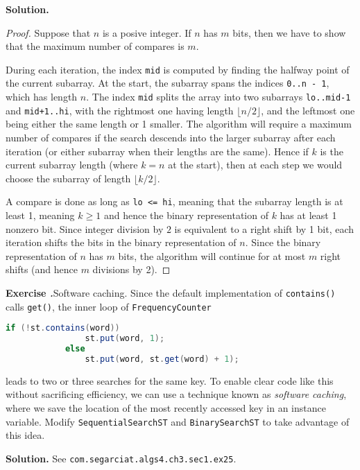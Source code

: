 \documentclass[12pt, a4paper]{article}
\newenvironment{ex}[2][Exercise]
{\par\medskip\noindent \textbf{#1 #2.}}
{\medskip}
\newenvironment{sol}[1][Solution]
{\par\medskip\noindent \textbf{#1.} }
{\medskip}
\begin{document}
	\begin{sol}
		\begin{proof}
			Suppose that $n$ is a posive integer. If $n$ has $m$ bits, then we have to
			show that the maximum number of compares is $m$.
			
			During each iteration, the index \texttt{mid} is computed by finding the
			halfway point of the current subarray. At the start, the subarray spans
			the indices \texttt{0..n - 1}, which has length $n$. The index \texttt{mid}
			splits the array into two subarrays \texttt{lo..mid-1} and \texttt{mid+1..hi},
			with the rightmost one having length $\lfloor n / 2\rfloor$, and the leftmost one
			being either the same length or 1 smaller. The algorithm will require
			a maximum number of compares if the search descends into the larger subarray
			after each iteration (or either subarray when their lengths are the same).
			Hence if $k$ is the current subarray length (where $k=n$ at the start), then
			at each step we would choose the subarray of length $\lfloor k / 2 \rfloor$.
			
			A compare is done as long as \texttt{lo <= hi}, meaning that the subarray
			length is at least 1, meaning $k\geq 1$ and hence the binary representation
			of $k$ has at least 1 nonzero bit. Since integer division by $2$ is equivalent
			to a right shift by 1 bit, each iteration shifts the bits in the binary
			representation of $n$. Since the binary representation of $n$ has $m$ bits,
			the algorithm will continue for at most $m$ right shifts (and hence $m$ divisions
			by 2).
		\end{proof}
	\end{sol}
	\begin{ex}{25}
		\emph{Software caching}. Since the default implementation of \texttt{contains()}
		calls \texttt{get()}, the inner loop of \texttt{FrequencyCounter}
		\begin{lstlisting}[language=java]
			if (!st.contains(word))
			    st.put(word, 1);
			else
			    st.put(word, st.get(word) + 1);
		\end{lstlisting}
		leads to two or three searches for the same key. To enable clear code like this
		without sacrificing efficiency, we can use a technique known as \emph{software caching},
		where we save the location of the most recently accessed key in an instance variable.
		Modify \texttt{SequentialSearchST} and \texttt{BinarySearchST} to take advantage of
		this idea.
	\end{ex}
	\begin{sol}
		See \texttt{com.segarciat.algs4.ch3.sec1.ex25}.
	\end{sol}
\end{document}
